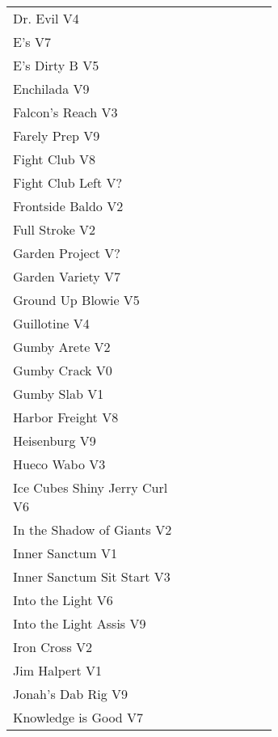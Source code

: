 \begin{flushleft}
\begin{center}
\begin{supertabular}{p{0.65\linewidth}r}
Dr. Evil V4 & \pageref{rt:Dr. Evil} \\
E's V7 & \pageref{rt:E's} \\
E's Dirty B V5 & \pageref{rt:E's Dirty B} \\
Enchilada V9 & \pageref{rt:Enchilada} \\
Falcon's Reach V3 & \pageref{rt:Falcon's Reach} \\
Farely Prep V9 & \pageref{rt:Farely Prep} \\
Fight Club V8 & \pageref{rt:Fight Club} \\
Fight Club Left V? & \pageref{rt:Fight Club Left} \\
Frontside Baldo V2 & \pageref{rt:Frontside Baldo} \\
Full Stroke V2 & \pageref{rt:Full Stroke} \\
Garden Project V? & \pageref{rt:Garden Project} \\
Garden Variety V7 & \pageref{rt:Garden Variety} \\
Ground Up Blowie V5 & \pageref{rt:Ground Up Blowie} \\
Guillotine V4 & \pageref{rt:Guillotine} \\
Gumby Arete V2 & \pageref{rt:Gumby Arete} \\
Gumby Crack V0 & \pageref{rt:Gumby Crack} \\
Gumby Slab V1 & \pageref{rt:Gumby Slab} \\
Harbor Freight V8 & \pageref{vr:Harbor Freight} \\
Heisenburg V9 & \pageref{rt:Heisenburg} \\
Hueco Wabo V3 & \pageref{rt:Hueco Wabo} \\
Ice Cubes Shiny Jerry Curl V6 & \pageref{rt:Ice Cubes Shiny Jerry Curl} \\
In the Shadow of Giants V2 & \pageref{rt:In the Shadow of Giants} \\
Inner Sanctum V1 & \pageref{rt:Inner Sanctum} \\
Inner Sanctum Sit Start V3 & \pageref{vr:Inner Sanctum Sit Start} \\
Into the Light V6 & \pageref{rt:Into the Light} \\
Into the Light Assis V9 & \pageref{vr:Into the Light Assis} \\
Iron Cross V2 & \pageref{vr:Iron Cross} \\
Jim Halpert V1 & \pageref{rt:Jim Halpert} \\
Jonah's Dab Rig V9 & \pageref{rt:Jonah's Dab Rig} \\
Knowledge is Good V7 & \pageref{rt:Knowledge is Good} \\

\end{supertabular}
\end{center}
\end{flushleft}
